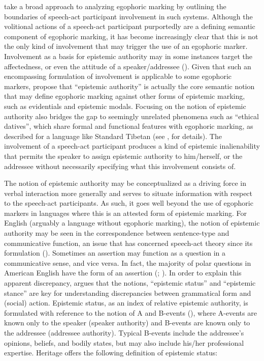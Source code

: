 \documentclass[output=paper]{langsci/langscibook}
\begin{document}
\cite{BergqvistKnuchel2017} take a broad approach to analyzing egophoric marking by outlining the boundaries of speech-act participant involvement in such systems. Although the volitional actions of a speech-act participant purportedly are a defining semantic component of egophoric marking, it has become increasingly clear that this is not the only kind of involvement that may trigger the use of an egophoric marker. Involvement as a basis for epistemic authority may in some instances target the affectedness, or even the attitude of a speaker/addressee (\citealt[369]{BergqvistKnuchel2017}). Given that such an encompassing formulation of involvement is applicable to some egophoric markers, \citeauthor{BergqvistKnuchel2017} propose that “epistemic authority” is actually the core semantic notion that may define egophoric marking against other forms of epistemic marking, such as evidentials and epistemic modals. Focusing on the notion of epistemic authority also bridges the gap to seemingly unrelated phenomena such as “ethical datives”, which share formal and functional features with egophoric marking, as described for a language like Standard Tibetan (see \citealt{BergqvistKnuchel2017}, for details). The involvement of a speech-act participant produces a kind of epistemic inalienability that permits the speaker to assign epistemic authority to him/herself, or the addressee without necessarily specifying what this involvement consists of.

The notion of epistemic authority may be conceptualized as a driving force in verbal interaction more generally and serves to situate information with respect to the speech-act participants. As such, it goes well beyond the use of egophoric markers in languages where this is an attested form of epistemic marking. For English (arguably a language without egophoric marking), the notion of epistemic authority may be seen in the correspondence between sentence-type and communicative function, an issue that has concerned speech-act theory since its formulation (\citealt{Searle1969}). Sometimes an assertion may function as a question in a communicative sense, and vice versa. In fact, the majority of polar questions in American English have the form of an assertion (\citealt{Stivers2010}; \citealt{StiversRossano2010}). In order to explain this apparent discrepancy, \cite{Heritage2012} argues that the notions, “epistemic status” and “epistemic stance” are key for understanding discrepancies between grammatical form and (social) action. Epistemic status, as an index of relative epistemic authority, is formulated with reference to the notion of A and B-events (\citealt{Labov1977}), where A-events are known only to the speaker (speaker authority) and B-events are known only to the addressee (addressee authority). Typical B-events include the addressee’s opinions, beliefs, and bodily states, but may also include his/her professional expertise. Heritage offers the following definition of epistemic status:
\end{document}
